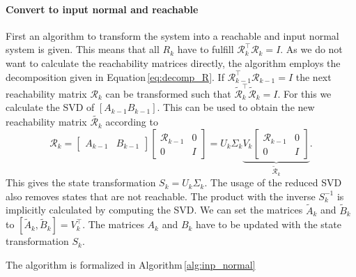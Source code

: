 \documentclass[numbers=noenddot,doctype=mastersthesis,BCOR=15mm,biblatex]{ldvbook}%
\newcommand{\R}{\mathcal{R}} %
\newcommand{\Ob}{\mathcal{O}} %
\newcommand{\eye}{I} %
\begin{document}

\paragraph{Convert to input normal and reachable}
First an algorithm to transform the system into a reachable and input normal system is given.
This means that all $R_k$ have to fulfill $\R_{k}^\top \R_{k}=\eye$.
As we do not want to calculate the reachability matrices directly, the algorithm employs the decomposition given in Equation\,\ref{eq:decomp_R}.
If $\R_{k-1}^\top \R_{k-1}=\eye$ the next reachability matrix $\R_{k}$ can be transformed such that $\tilde{\R}_{k}^\top \tilde{\R}_{k}=\eye$.
For this we calculate the SVD of $[A_{k-1} B_{k-1}]$.
This can be used to obtain the new reachability matrix $\tilde{\R_{k}}$ according to
\begin{equation}
\R_k = 
\begin{bmatrix}
A_{k-1} & B_{k-1}
\end{bmatrix}
\begin{bmatrix}
\R_{k-1} &0\\
0& \eye
\end{bmatrix}
=U_k\Sigma _k
\underbrace{V_k
\begin{bmatrix}
\R_{k-1} &0\\
0& \eye
\end{bmatrix}}_{\tilde{\R}_k}
.
\end{equation}
This gives the state transformation $S_k = U_k\Sigma_k$. 
The usage of the reduced SVD also removes states that are not reachable.%
The product with the inverse $S_k^{-1}$ is implicitly calculated by computing the SVD.
We can set the matrices $\tilde{A}_k$ and $\tilde{B}_k$ to $[\tilde{A}_k,\tilde{B}_k]=V_k^\top$.
The matrices $A_{k}$ and $B_{k}$ have to be updated with the state transformation $S_k$.

The algorithm is formalized in Algorithm\,\ref{alg:inp_normal}
\end{document}

